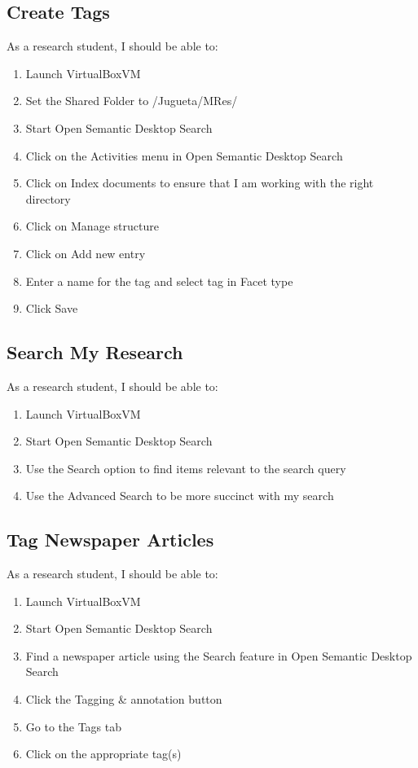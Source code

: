 \documentclass{article}
\begin{document}
\subsection*{Create Tags}

As a research student, I should be able to:
\begin{enumerate}
    \item Launch VirtualBoxVM
    \item Set the Shared Folder to /Jugueta/MRes/
    \item Start Open Semantic Desktop Search
    \item Click on the Activities menu in Open Semantic Desktop Search
    \item Click on Index documents to ensure that I am working with the right directory
    \item Click on Manage structure
    \item Click on Add new entry
    \item Enter a name for the tag and select tag in Facet type
    \item Click Save
\end{enumerate}

\subsection*{Search My Research}

As a research student, I should be able to:
\begin{enumerate}
    \item Launch VirtualBoxVM
    \item Start Open Semantic Desktop Search
    \item Use the Search option to find items relevant to the search query
    \item Use the Advanced Search to be more succinct with my search
\end{enumerate}

\subsection*{Tag Newspaper Articles}

As a research student, I should be able to:
\begin{enumerate}
    \item Launch VirtualBoxVM
    \item Start Open Semantic Desktop Search
    \item Find a newspaper article using the Search feature in Open Semantic Desktop Search
    \item Click the Tagging \& annotation button
    \item Go to the Tags tab
    \item Click on the appropriate tag(s)
\end{enumerate}
\end{document}
